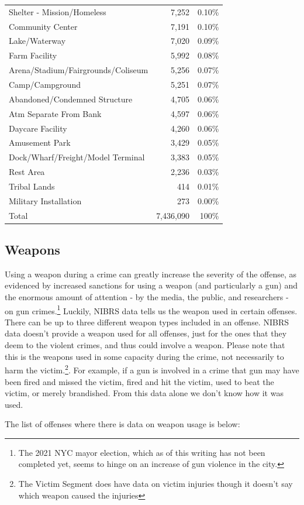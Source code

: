 \documentclass[
  12pt,
  openany]{book}
\begin{document}
\begin{longtable}[]{@{}lrr@{}}
Shelter - Mission/Homeless & 7,252 & 0.10\%\tabularnewline
Community Center & 7,191 & 0.10\%\tabularnewline
Lake/Waterway & 7,020 & 0.09\%\tabularnewline
Farm Facility & 5,992 & 0.08\%\tabularnewline
Arena/Stadium/Fairgrounds/Coliseum & 5,256 & 0.07\%\tabularnewline
Camp/Campground & 5,251 & 0.07\%\tabularnewline
Abandoned/Condemned Structure & 4,705 & 0.06\%\tabularnewline
Atm Separate From Bank & 4,597 & 0.06\%\tabularnewline
Daycare Facility & 4,260 & 0.06\%\tabularnewline
Amusement Park & 3,429 & 0.05\%\tabularnewline
Dock/Wharf/Freight/Model Terminal & 3,383 & 0.05\%\tabularnewline
Rest Area & 2,236 & 0.03\%\tabularnewline
Tribal Lands & 414 & 0.01\%\tabularnewline
Military Installation & 273 & 0.00\%\tabularnewline
Total & 7,436,090 & 100\%\tabularnewline
\bottomrule
\end{longtable}

\hypertarget{weapons}{%
\subsection{Weapons}\label{weapons}}

Using a weapon during a crime can greatly increase the severity of the offense, as evidenced by increased sanctions for using a weapon (and particularly a gun) and the enormous amount of attention - by the media, the public, and researchers - on gun crimes.\footnote{The 2021 NYC mayor election, which as of this writing has not been completed yet, seems to hinge on an increase of gun violence in the city.} Luckily, NIBRS data tells us the weapon used in certain offenses. There can be up to three different weapon types included in an offense. NIBRS data doesn't provide a weapon used for all offenses, just for the ones that they deem to the violent crimes, and thus could involve a weapon. Please note that this is the weapons used in some capacity during the crime, not necessarily to harm the victim.\footnote{The Victim Segment does have data on victim injuries though it doesn't say which weapon caused the injuries}. For example, if a gun is involved in a crime that gun may have been fired and missed the victim, fired and hit the victim, used to beat the victim, or merely brandished. From this data alone we don't know how it was used.

The list of offenses where there is data on weapon usage is below:
\end{document}
